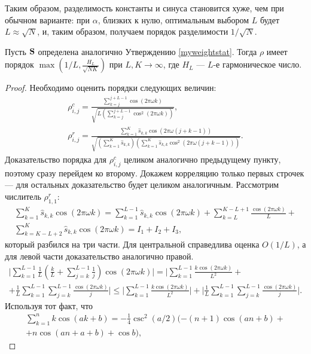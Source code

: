 \documentclass[12pt,a4paper,fleqn,leqno]{article}
\begin{document}
Таким образом, разделимость константы и синуса становится хуже, чем при обычном варианте: при $\alpha$, близких к нулю, оптимальным выбором $L$ будет $L \approx \sqrt{N}$, и, таким образом, получаем порядок разделимости $1/\sqrt{N}$.
\begin{lemma}
Пусть $\mathbf{S}$ определена аналогично Утверждению \ref{myweightstat}. Тогда $\rho$ имеет порядок $\max \left(1/L, \frac{H_L}{\sqrt{NK}} \right)$ при $L, K \to \infty$, где $H_L$ --- $L$-е гармоническое число.
\end{lemma}
\begin{proof}
Необходимо оценить порядки следующих величин:
\begin{gather*}
\rho^c_{i,j} = \frac{\sum_{k=j}^{j + L - 1} \cos(2 \pi \omega k)}{\sqrt{L (\sum_{k=j}^{j + L - 1} \cos^2(2 \pi \omega k))}}, \\ \rho^r_{i,j} = \frac{\sum_{k=1}^K \hat s_{k,k}\cos(2 \pi \omega (j + k - 1))}{\sqrt{(\sum_{k=1}^K \hat s_{k,k}) (\sum_{k=1}^K \hat s_{k,k}\cos^2(2 \pi \omega (j + k - 1)))}}.
\end{gather*}
Доказательство порядка для $\rho^c_{i,j}$ целиком аналогично предыдущему пункту, поэтому сразу перейдем ко второму. Докажем корреляцию только первых строчек --- для остальных доказательство будет целиком аналогичным. Рассмотрим числитель $\rho^r_{1,1}$:
\begin{gather*}
\sum_{k=1}^K \hat s_{k,k}\cos(2 \pi \omega k) = \sum_{k=1}^{L-1} \hat s_{k,k}\cos(2 \pi \omega k) + \sum_{k=L}^{K - L + 1} \frac{\cos(2 \pi \omega k)}{L} +\\ \sum_{k=K - L + 2}^{K} \hat s_{k,k}\cos(2 \pi \omega k) = I_1 + I_2 + I_3,
\end{gather*}
который разбился на три части. Для центральной справедлива оценка $O(1/L)$, а для левой части доказательство аналогично правой.
\begin{gather*}
\bigg|\sum_{k=1}^{L-1}\frac{1}{L}\left(\frac{k}{L} + \sum_{j=k}^{L-1} \frac{1}{j} \right) \cos(2 \pi \omega k)\bigg| = \bigg|\sum_{k=1}^{L-1} \frac{k \cos(2 \pi \omega k)}{L^2} + \\ + \frac{1}{L}\sum_{k = 1}^{L-1}\sum_{j = k}^{L-1}\frac{\cos(2 \pi \omega k)}{j}\bigg| \le 
\bigg|\sum_{k=1}^{L-1} \frac{k \cos(2 \pi \omega k)}{L^2}\bigg| + \bigg|\frac{1}{L}\sum_{k = 1}^{L-1}\sum_{j = k}^{L-1}\frac{\cos(2 \pi \omega k)}{j}\bigg|.
\end{gather*}
Используя тот факт, что
\begin{gather*}
\sum_{k=1}^n k \cos(ak + b) = -\frac{1}{4}\csc^2(a/2)(-(n+1)\cos(an+b) + \\ + n\cos(an + a + b) + \cos b),

\end{gather*}
\end{proof}
\end{document}
